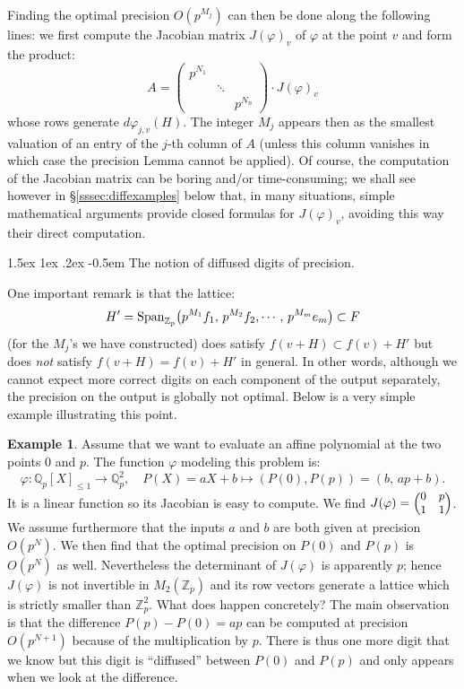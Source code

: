 \documentclass[11pt]{article}
\makeatletter
\numberwithin{equation}{section}
\numberwithin{figure}{section}
\renewcommand\subparagraph{\@startsection{subparagraph}{5}{\z@}%
                                       {1.5ex \@plus1ex \@minus .2ex}%
                                       {-0.5em}%
                                      {\normalfont\normalsize\it}}
\renewcommand{\leq}{\leqslant}
\theoremstyle{definition}
\newtheorem*{ex*}{Example}
\newcommand{\Z}{\mathbb Z}
\newcommand{\Zp}{\Z_p}
\newcommand{\Q}{\mathbb Q}
\newcommand{\Qp}{\Q_p}
\newcommand{\Span}{\text{\rm Span}}
\makeatother
\begin{document}
Finding the optimal precision $O(p^{M_j})$ can then be done along the
following lines: we first compute the Jacobian matrix $J(\varphi)_v$
of $\varphi$ at the point $v$ and form the product:
\begin{equation}
\label{eq:jacobianzealous}
A = \left( \begin{matrix}
p^{N_1} & & \\ & \ddots & \\ & & p^{N_n}
\end{matrix}\right) \cdot J(\varphi)_v
\end{equation}
whose rows generate $d\varphi_{j,v}(H)$. The integer $M_j$ appears
then as the smallest valuation of an entry of the $j$-th column of
$A$ (unless this column vanishes in which case the precision Lemma
cannot be applied). Of course, the computation of the Jacobian matrix 
can be boring and/or time-consuming; we shall see however in
\S \ref{sssec:diffexamples} below that, in many situations, simple
mathematical arguments provide closed formulas for $J(\varphi)_v$,
avoiding this way their direct computation.

\subparagraph{The notion of diffused digits of precision.}

One important remark is that the lattice:
$$H' = \Span_{\Zp} \big( p^{M_1} f_1, \, p^{M_2} f_2, \cdots, \,
p^{M_m} e_m \big) \subset F$$
(for the $M_j$'s we have constructed) does satisfy $f(v+H) \subset f(v) 
+ H'$ but does \emph{not} satisfy $f(v+H) = f(v) + H'$ in general.
In other words, although we cannot expect more correct digits on each 
component of the output separately, the precision on the output is 
globally not optimal. Below is a very simple example illustrating this 
point.

\begin{ex*}
Assume that we want to evaluate an affine polynomial at the two points 
$0$ and $p$. The function $\varphi$ modeling this problem is:
$$\varphi : \Qp[X]_{\leq 1} \to \Qp^2, 
\quad P(X) = a X + b \mapsto (P(0), P(p)) = (b,\,ap{+}b).$$
It is a linear function so its Jacobian is easy to compute. We find
$J(\varphi) = \Big( {\small \begin{matrix} 0 & p \\ 1 & 1
\end{matrix}} \Big)$.
We assume furthermore that the inputs $a$ and $b$ are both given at
precision $O(p^N)$. We then find that the optimal precision on $P(0)$ and 
$P(p)$ is $O(p^N)$ as well. Nevertheless the determinant of $J(\varphi)$
is apparently $p$; hence $J(\varphi)$ is not invertible in $M_2(\Zp)$ 
and its row vectors generate a lattice which is strictly smaller than 
$\Zp^2$. 
What does happen concretely? The main observation is that the difference 
$P(p) - P(0) = ap$ can be computed at precision $O(p^{N+1})$ because
of the multiplication by $p$. There is thus one more digit that we know
but this digit is ``diffused'' between $P(0)$ and $P(p)$ and only appears
when we look at the difference.
\end{ex*}
\end{document}
